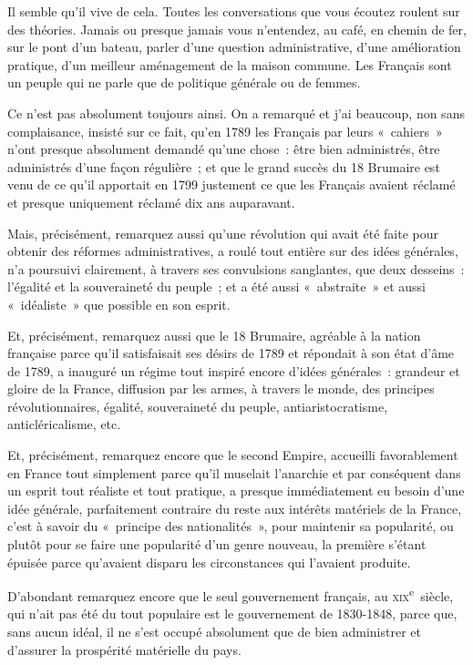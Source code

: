 \documentclass[french,twoside]{book} %
\begin{document}
Il semble qu’il vive de cela. Toutes les conversations que vous écoutez roulent sur des théories. Jamais ou presque jamais vous n’entendez, au café, en chemin de fer, sur le pont d’un bateau, parler d’une question administrative, d’une amélioration pratique, d’un meilleur aménagement de la maison commune. Les Français sont un peuple qui ne parle que de politique générale ou de femmes.\par
Ce n’est pas absolument toujours ainsi. On a remarqué et j’ai beaucoup, non sans complaisance, insisté sur ce fait, qu’en 1789 les Français par leurs « cahiers » n’ont presque absolument demandé qu’une chose : être bien administrés, être administrés d’une façon régulière ; et que le grand succès du 18 Brumaire est venu de ce qu’il apportait en 1799 justement ce que les Français avaient réclamé et presque uniquement réclamé dix ans auparavant.\par
 Mais, précisément, remarquez aussi qu’une révolution qui avait été faite pour obtenir des réformes administratives, a roulé tout entière sur des idées générales, n’a poursuivi clairement, à travers ses convulsions sanglantes, que deux desseins : l’égalité et la souveraineté du peuple ; et a été aussi « abstraite » et aussi « idéaliste » que possible en son esprit.\par
Et, précisément, remarquez aussi que le 18 Brumaire, agréable à la nation française parce qu’il satisfaisait ses désirs de 1789 et répondait à son état d’âme de 1789, a inauguré un régime tout inspiré encore d’idées générales : grandeur et gloire de la France, diffusion par les armes, à travers le monde, des principes révolutionnaires, égalité, souveraineté du peuple, antiaristocratisme, anticléricalisme, etc.\par
Et, précisément, remarquez encore que le second Empire, accueilli favorablement en France tout simplement parce qu’il muselait l’anarchie et par conséquent dans un esprit tout réaliste et tout pratique, a presque immédiatement eu besoin d’une idée générale, parfaitement contraire du reste aux intérêts matériels de la France, c’est à savoir du « principe des nationalités », pour maintenir sa popularité, ou plutôt pour se faire une popularité d’un genre nouveau, la première s’étant épuisée  parce qu’avaient disparu les circonstances qui l’avaient produite.\par
D’abondant remarquez encore que le seul gouvernement français, au \textsc{xix}\textsuperscript{e} siècle, qui n’ait pas été du tout populaire est le gouvernement de 1830-1848, parce que, sans aucun idéal, il ne s’est occupé absolument que de bien administrer et d’assurer la prospérité matérielle du pays.\par
\end{document}
